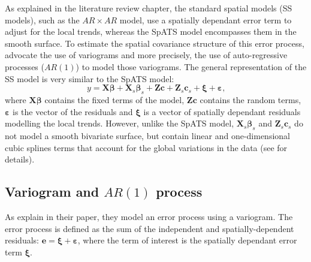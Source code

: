 As explained in the literature review chapter, the standard spatial models (SS models), such as the $AR \times AR$ model, use a spatially dependant error term to adjust for the local trends, whereas the SpATS model encompasses them in the smooth surface. 
To estimate the spatial covariance structure of this error process, \textcite{gilmour_accounting_1997} advocate the use of variograms and more precisely, the use of auto-regressive processes ($AR(1)$) to model those variograms. 
The general representation of the SS model is very similar to the SpATS model:
\begin{equation}
	y = \mathbf{X}\boldsymbol{\beta} + \mathbf{X}_{s}\boldsymbol{\beta}_{s} + \mathbf{Zc} +  \mathbf{Z}_{s}\mathbf{c}_{s} + 
	\boldsymbol{\xi} + \boldsymbol{\varepsilon}
	\text{,}
	\label{eq:standard_spatial_model}
\end{equation}
where $\mathbf{X}\boldsymbol{\beta}$ contains the fixed terms of the model, $\mathbf{Zc}$ contains the random terms, $\boldsymbol{\varepsilon}$ is the vector of the residuals and $\boldsymbol{\xi}$ is a vector of spatially dependant residuals modelling the local trends. However, unlike the SpATS model, $\mathbf{X}_{s}\boldsymbol{\beta}_{s}$ and $\mathbf{Z}_{s}\mathbf{c}_{s}$ do not model a smooth bivariate surface, but contain linear and one-dimensional cubic splines terms that account for the global variations in the data (see \textcite{verbyla_analysis_1999} for details).\\

\subsection{Variogram and $AR(1)$ process}
As \textcite{gilmour_accounting_1997} explain in their paper, they model an error process using a variogram. The error process is defined as the sum of the independent and spatially-dependent residuals: $\mathbf{e} = \mathbf{\xi} + \mathbf{\varepsilon}$, where the term of interest is the spatially dependant error term $\boldsymbol{\xi}$.\\

